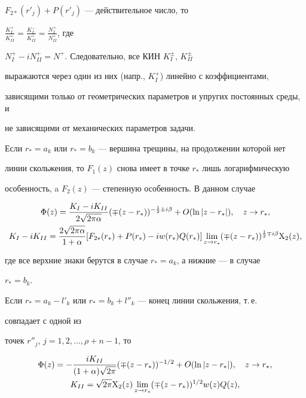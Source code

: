 $F_{2\ast}(r'_j)+P(r'_j)$ --- действительное число, то 


$\frac{K^+_I}{K^+_{II}}=\frac{K^-_I}{K^+_{II}}=\frac{N^+_I}{N^+_{II}}$, где 


$N^+_I-iN^+_{II}=N^+$. Следовательно, все КИН $K^\pm_I$, $K^\pm_{II}$ 


выражаются через один из них (напр., $K^+_I$) линейно с коэффициентами, 


зависящими только от геометрических параметров и упругих постоянных среды, и 


не зависящими от механических параметров задачи. 


 


Если $r_*=a_k$ или $r_*=b_k$ --- вершина трещины, на продолжении которой нет 


линии скольжения, то $F_1(z)$ снова имеет в точке $r_*$ лишь логарифмическую 


особенность, a $F_2(z)$ --- степенную особенность. В данном случае 


\begin{gather*} 


\Phi(z)=\frac{K_I-i K_{II}}{2\sqrt{2\pi\alpha}}(\mp(z-r_*) 


)^{-\frac{1}{2}\pm i\beta}+O(\ln|z-r_*|),\quad z\to r_*,\\ 


K_I-i K_{II}=\frac{2\sqrt{2\pi\alpha}}{1+\alpha}[F_{2\ast}(r_*)+ 


P(r_*)-i w(r_*)Q(r_*)]\lim_{z\to r_*}(\mp 


(z-r_*))^{\frac{1}{2}\mp i\beta}\X_2(z), 


\end{gather*} 


где все верхние знаки берутся в случае $r_*=a_k$, а нижние --- в случае 


$r_*=b_k$. 


 


Если $r_*=a_k-l'_k$ или $r_*=b_k+l''_k$ --- конец линии скольжения, т.\,е. 


совпадает с одной из 


точек $r''_j$, $j=1,2,\dotsc,\rho+n-1$, то 


\begin{gather} 


\Phi(z)=-\frac{i K_{II}}{(1+\alpha)\sqrt{2\pi}}(\mp(z-r_*) 


)^{-1/2}+O(\ln|z-r_*|),\quad z\to r_*,\\ 


K_{II}=\sqrt{2\pi}\X_2(z)\lim_{z\to r_*} 


(\mp(z-r_*))^{1/2}w(z)Q(z),\notag 


\end{gather} 


